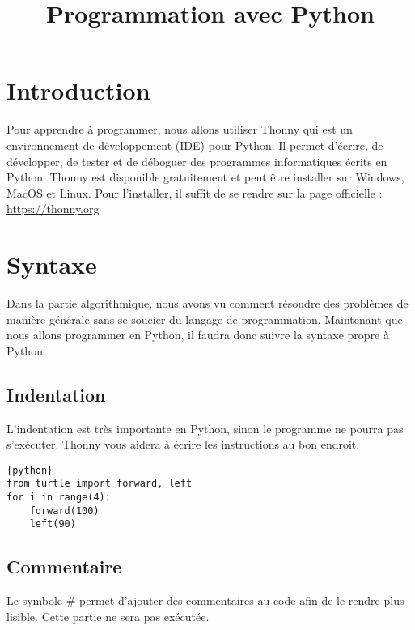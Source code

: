 \documentclass[a4paper,11pt]{article}
\begin{document}
\title{Programmation avec Python}
\date{}
\maketitle

\section{Introduction}
Pour apprendre à programmer, nous allons utiliser Thonny qui est un environnement de développement (IDE) pour Python. Il permet d’écrire, de développer, de tester et de déboguer des programmes informatiques écrits en Python.
Thonny est disponible gratuitement et peut être installer sur Windows, MacOS et Linux.
Pour l’installer, il suffit de se rendre sur la page officielle :  \url{https://thonny.org}

\section{Syntaxe}
Dans la partie algorithmique, nous avons vu comment résoudre des problèmes de manière générale sans se soucier du langage de programmation. Maintenant que nous allons programmer en Python, il faudra donc suivre la syntaxe propre à Python.

\subsection{Indentation}
L'indentation est très importante en Python, sinon le programme ne pourra pas s'exécuter. Thonny vous aidera à écrire les instructions au bon endroit.
\begin{verbatim}{python}
from turtle import forward, left
for i in range(4):
    forward(100)
    left(90)
\end{verbatim}

\subsection{Commentaire}
Le symbole \# permet d'ajouter des commentaires au code afin de le rendre plus lisible. Cette partie ne sera pas exécutée.
\end{document}
